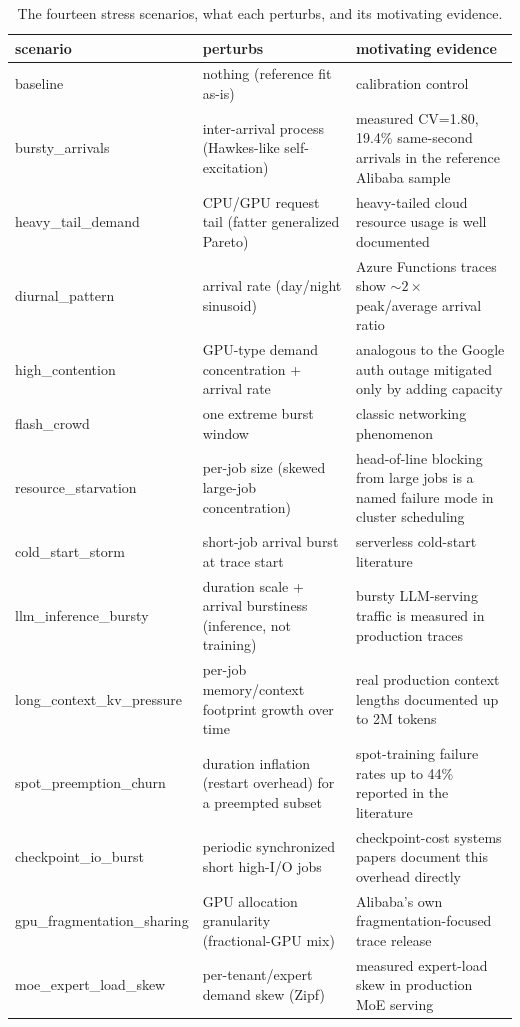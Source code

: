 \documentclass[11pt]{article}
\begin{document}
\begin{table}[h]
\centering
\caption{The fourteen stress scenarios, what each perturbs, and its
motivating evidence.}
\label{tab:scenarios}
\scriptsize
\begin{tabular}{p{2.7cm}p{5.6cm}p{5.6cm}}
\toprule
scenario & perturbs & motivating evidence \\
\midrule
baseline & nothing (reference fit as-is) & calibration control \\
bursty\_arrivals & inter-arrival process (Hawkes-like self-excitation) & measured CV=1.80, 19.4\% same-second arrivals in the reference Alibaba sample \\
heavy\_tail\_demand & CPU/GPU request tail (fatter generalized Pareto) & heavy-tailed cloud resource usage is well documented \citep{reiss2012} \\
diurnal\_pattern & arrival rate (day/night sinusoid) & Azure Functions traces show $\sim2\times$ peak/average arrival ratio \citep{shahrad2020} \\
high\_contention & GPU-type demand concentration + arrival rate & analogous to the Google auth outage mitigated only by adding capacity \citep{outagestats2025} \\
flash\_crowd & one extreme burst window & classic networking phenomenon \citep{shahrad2020} \\
resource\_starvation & per-job size (skewed large-job concentration) & head-of-line blocking from large jobs is a named failure mode in cluster scheduling \\
cold\_start\_storm & short-job arrival burst at trace start & serverless cold-start literature \citep{shahrad2020} \\
llm\_inference\_bursty & duration scale + arrival burstiness (inference, not training) & bursty LLM-serving traffic is measured in production traces \\
long\_context\_kv\_pressure & per-job memory/context footprint growth over time & real production context lengths documented up to 2M tokens \\
spot\_preemption\_churn & duration inflation (restart overhead) for a preempted subset & spot-training failure rates up to 44\% reported in the literature \\
checkpoint\_io\_burst & periodic synchronized short high-I/O jobs & checkpoint-cost systems papers document this overhead directly \\
gpu\_fragmentation\_sharing & GPU allocation granularity (fractional-GPU mix) & Alibaba's own fragmentation-focused trace release \citep{alibabatrace2023} \\
moe\_expert\_load\_skew & per-tenant/expert demand skew (Zipf) & measured expert-load skew in production MoE serving \\
\bottomrule
\end{tabular}
\end{table}
\end{document}
